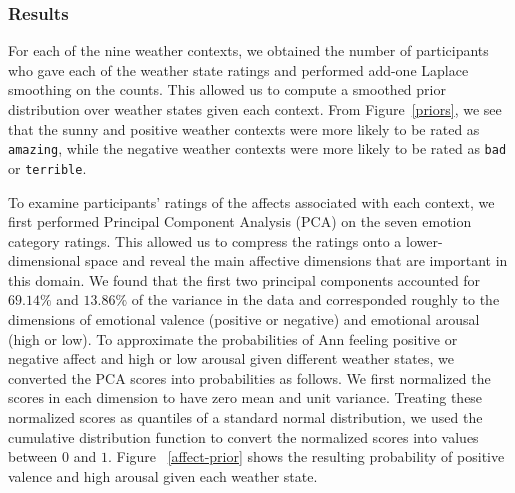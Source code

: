 \documentclass[10pt,letterpaper]{article}
\begin{document}
 
\subsubsection{Results}

For each of the nine weather contexts, we obtained the number of participants who gave each of the weather state ratings and performed add-one Laplace smoothing on the counts. This allowed us to compute a smoothed prior distribution over weather states given each context. From Figure~\ref{priors}, we see that the sunny and positive weather contexts were more likely to be rated as \texttt{amazing}, while the negative weather contexts were more likely to be rated as \texttt{bad} or \texttt{terrible}.  %

To examine participants' ratings of the affects associated with each context, we first performed Principal Component Analysis (PCA) on the seven emotion category ratings. This allowed us to compress the ratings onto a lower-dimensional space and reveal the main affective dimensions that are important in this domain. We found that the first two principal components accounted for $69.14\%$ and $13.86\%$ of the variance in the data and corresponded roughly to the dimensions of emotional valence (positive or negative) and emotional arousal (high or low). 
To approximate the probabilities of Ann feeling positive or negative affect and high or low arousal given different weather states, we converted the PCA scores into probabilities as follows. We first normalized the scores in each dimension to have zero mean and unit variance. Treating these normalized scores as quantiles of a standard normal distribution, we used the cumulative distribution function to convert the normalized scores into values between $0$ and $1$. Figure ~\ref{affect-prior} shows the resulting probability of positive valence and high arousal given each weather state. 

\end{document}
